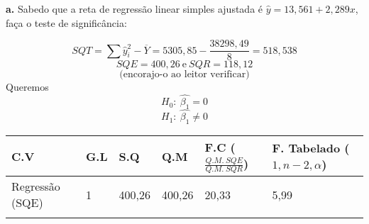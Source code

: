 \documentclass[
]{book}
\begin{document}
\textbf{a.} Sabedo que a reta de regressão linear simples ajustada é \(\hat{y}=13,561+2,289x\), faça o teste de significância:

\[SQT=\sum \hat{y}^2_i - \overline{Y}=5305,85-\frac{38298,49}{8}=518,538\]
\[SQE = 400,26 \ \mbox{e} \ SQR=118,12\]
\[\mbox{(encorajo-o ao leitor verificar)}\]
Queremos
\[H_0: \ \hat{\beta_1}=0\]
\[H_1: \ \hat{\beta_1}\neq 0\]

\begin{longtable}[]{@{}llllll@{}}
\toprule
\begin{minipage}[b]{0.14\columnwidth}\raggedright
C.V\strut
\end{minipage} & \begin{minipage}[b]{0.14\columnwidth}\raggedright
G.L\strut
\end{minipage} & \begin{minipage}[b]{0.14\columnwidth}\raggedright
S.Q\strut
\end{minipage} & \begin{minipage}[b]{0.14\columnwidth}\raggedright
Q.M\strut
\end{minipage} & \begin{minipage}[b]{0.14\columnwidth}\raggedright
F.C (\(\frac{Q.M. \  SQE}{Q.M.\ SQR}\))\strut
\end{minipage} & \begin{minipage}[b]{0.14\columnwidth}\raggedright
F. Tabelado (\(1,n-2,\alpha\))\strut
\end{minipage}\tabularnewline
\midrule
\endhead
\begin{minipage}[t]{0.14\columnwidth}\raggedright
Regressão (SQE)\strut
\end{minipage} & \begin{minipage}[t]{0.14\columnwidth}\raggedright
1\strut
\end{minipage} & \begin{minipage}[t]{0.14\columnwidth}\raggedright
400,26\strut
\end{minipage} & \begin{minipage}[t]{0.14\columnwidth}\raggedright
400,26\strut
\end{minipage} & \begin{minipage}[t]{0.14\columnwidth}\raggedright
20,33\strut
\end{minipage} & \begin{minipage}[t]{0.14\columnwidth}\raggedright
5,99\strut
\end{minipage}\tabularnewline
\begin{minipage}[t]{0.14\columnwidth}\raggedright

\end{minipage}
\end{longtable}
\end{document}
